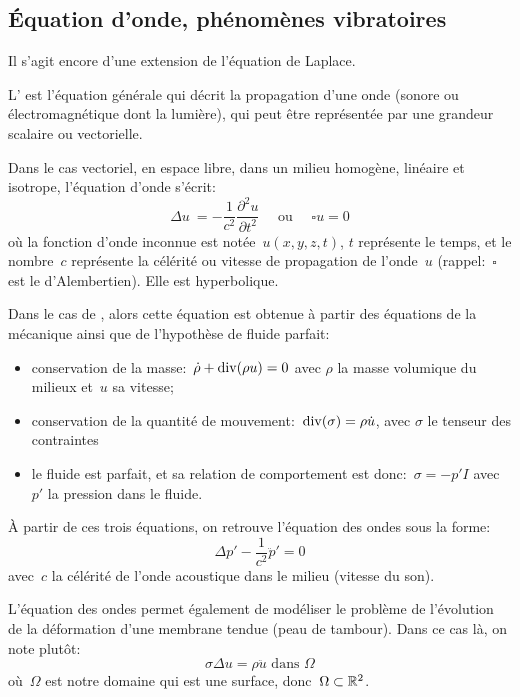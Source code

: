 \medskip
\subsection{Équation d'onde, phénomènes vibratoires}

Il s'agit encore d'une extension de l'équation de Laplace.

L' est l'équation générale qui décrit la propagation d'une onde
(sonore ou électromagnétique dont la lumière),
qui peut être représentée par une grandeur scalaire ou vectorielle.


Dans le cas vectoriel, en espace libre, dans un milieu homogène, linéaire et isotrope, l'équation d'onde s'écrit:
\begin{equation}
  \Delta u \ = - \frac1{c^2} \dfrac{\partial^2 u}{\partial t^2} \quad \text{ ou } \quad \square u =0
\end{equation}
où la fonction d'onde inconnue est notée~$u(x,y,z,t)$, $t$ représente le temps, et 
le nombre~$c$ représente la célérité ou vitesse de propagation de l'onde~$u$ 
(rappel:~$\square$ est le d'Alembertien). Elle est hyperbolique.

\medskip
Dans le cas de , alors cette équation est obtenue à partir des 
équations de la mécanique ainsi que de l'hypothèse de fluide parfait:
\begin{itemize}
  \item conservation de la masse:~$\dot{\rho}+\operatorname{div}(\rho u)=0$ avec
	$\rho$ la masse volumique du milieux et~$u$ sa vitesse;
  \item conservation de la quantité de mouvement:~$\operatorname{div}(\sigma)=\rho\dot{u}$, avec
	$\sigma$ le tenseur des contraintes
  \item le fluide est parfait, et sa relation de comportement est donc:~$\sigma=-p'I$ avec
	$p'$ la pression dans le fluide.
\end{itemize}

À partir de ces trois équations, on retrouve l'équation des ondes sous la forme:
\begin{equation}
\Delta p' - \dfrac1{c^2} \ddot{p}' = 0
\end{equation}
avec~$c$ la célérité de l'onde acoustique dans le milieu (vitesse du son).

\medskip
L'équation des ondes permet également de modéliser le problème de l'évolution 
de la déformation d'une membrane tendue (peau de tambour).
Dans ce cas là, on note plutôt:
\begin{equation}
 \sigma \Delta u = \rho\ddot{u} \text{ dans }\Omega
\end{equation}
où~$\Omega$ est notre domaine qui est une surface, donc~$\Omega\subset\mathbb R^2$.

